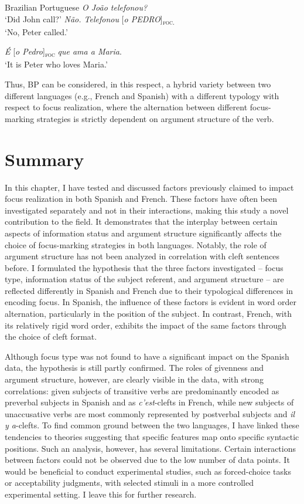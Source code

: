 \ea \label{ex:5:15} Brazilian Portuguese
\ea \textit{O João telefonou?}\\
 ‘Did John call?'
\ex  \textit{Não. Telefonou} {[\textit{o PEDRO}]\textsubscript{\textsc{foc.}}}\normalsize\\
‘No, Peter called.' \hfill \parencite[9]{kato2006focus}    
\z \z

\ea \label{ex:5:16}
\textit{É} {[\textit{o Pedro}]\textsubscript{\textsc{foc}}} \normalsize \textit{que ama a Maria}.\\
`It is Peter who loves Maria.’ \hfill \parencite[10]{kato2006focus}   
\z


Thus, BP can be considered, in this respect, a hybrid variety between two different languages (e.g., French and Spanish) with a different typology with respect to focus realization, where the alternation between different focus-marking strategies is strictly dependent on argument structure of the verb.

\section{Summary} \label{sub:6.11}
In this chapter, I have tested and discussed factors previously claimed to impact focus realization in both Spanish and French. These factors have often been investigated separately and not in their interactions, making this study a novel contribution to the field. It demonstrates that the interplay between certain aspects of information status and argument structure significantly affects the choice of focus-marking strategies in both languages. Notably, the role of argument structure has not been analyzed in correlation with cleft sentences before.
I formulated the hypothesis that the three factors investigated -- focus type, information status of the subject referent, and argument structure -- are reflected differently in Spanish and French due to their typological differences in encoding focus. In Spanish, the influence of these factors is evident in word order alternation, particularly in the position of the subject. In contrast, French, with its relatively rigid word order, exhibits the impact of the same factors through the choice of cleft format.

Although focus type was not found to have a significant impact on the Spanish data, the hypothesis is still partly confirmed. The roles of givenness and argument structure, however, are clearly visible in the data, with strong correlations: given subjects of transitive verbs are predominantly encoded as preverbal subjects in Spanish and as \textit{c'est}-clefts in French, while new subjects of unaccusative verbs are most commonly represented by postverbal subjects and \textit{il y a}-clefts.
To find common ground between the two languages, I have linked these tendencies to theories suggesting that specific features map onto specific syntactic positions. Such an analysis, however, has several limitations. Certain interactions between factors could not be observed due to the low number of data points. It would be beneficial to conduct experimental studies, such as forced-choice tasks or acceptability judgments, with selected stimuli in a more controlled experimental setting. I leave this for further research.
